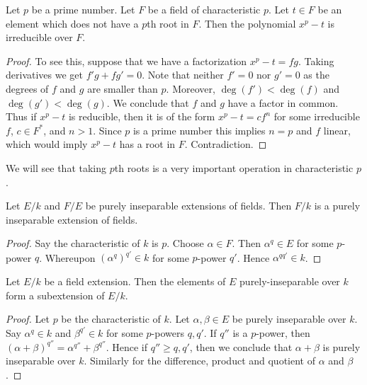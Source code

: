 \begin{lemma}
\label{lemma-take-pth-root}
Let $p$ be a prime number. Let $F$ be a field of characteristic $p$.
Let $t \in F$ be an element which does not have a $p$th root in $F$.
Then the polynomial $x^p - t$ is irreducible over $F$.
\end{lemma}

\begin{proof}
To see this, suppose that we have a factorization
$x^p - t = f g$. Taking derivatives we get $f' g + f g' = 0$.
Note that neither $f' = 0$ nor $g' = 0$ as the degrees of $f$ and $g$
are smaller than $p$. Moreover, $\deg(f') < \deg(f)$ and $\deg(g') < \deg(g)$.
We conclude that $f$ and $g$ have a factor in common. Thus if $x^p - t$
is reducible, then it is of the form $x^p - t = c f^n$ for some irreducible
$f$, $c \in F^*$, and $n > 1$. Since $p$ is a prime number this
implies $n = p$ and $f$ linear, which would imply $x^p - t$ has a root
in $F$. Contradiction.
\end{proof}

\noindent
We will see that taking $p$th roots is a very important operation in
characteristic $p$.

\begin{lemma}
\label{lemma-purely-inseparable-permanence}
Let $E/k$ and $F/E$ be purely inseparable extensions of fields. Then $F/k$
is a purely inseparable extension of fields.
\end{lemma}

\begin{proof}
Say the characteristic of $k$ is $p$. Choose $\alpha \in F$. Then
$\alpha^q \in E$ for some $p$-power $q$. Whereupon $(\alpha^q)^{q'} \in k$
for some $p$-power $q'$. Hence $\alpha^{qq'} \in k$.
\end{proof}

\begin{lemma}
\label{lemma-purely-inseparable-elements}
Let $E/k$ be a field extension. Then the elements of $E$ purely-inseparable
over $k$ form a subextension of $E/k$.
\end{lemma}

\begin{proof}
Let $p$ be the characteristic of $k$.
Let $\alpha, \beta \in E$ be purely inseparable over $k$. Say
$\alpha^q \in k$ and $\beta^{q'} \in k$ for some $p$-powers $q, q'$.
If $q''$ is a $p$-power, then
$(\alpha + \beta)^{q''} = \alpha^{q''} + \beta^{q''}$.
Hence if $q'' \geq q, q'$, then we conclude that $\alpha + \beta$
is purely inseparable over $k$. Similarly for the difference,
product and quotient of $\alpha$ and $\beta$.
\end{proof}

